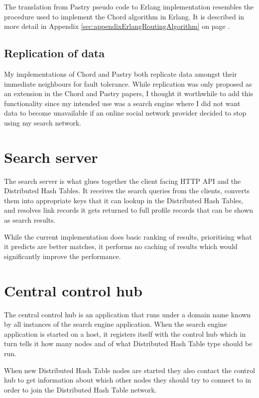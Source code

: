 

The translation from Pastry pseudo code to Erlang implementation resembles the procedure used to implement the Chord algorithm in Erlang. It is described in more detail in Appendix \ref{sec:appendixErlangRoutingAlgorithm} on page \pageref{sec:appendixErlangRoutingAlgorithm}.

\subsection{Replication of data}
My implementations of Chord and Pastry both replicate data amongst their immediate neighbours for fault tolerance. While replication was only proposed as an extension in the Chord \cite{chord} and Pastry \cite{pastry} papers, I thought it worthwhile to add this functionality since my intended use was a search engine where I did not want data to become unavailable if an online social network provider decided to stop using my search network.

\section{Search server}
The search server is what glues together the client facing HTTP API and the Distributed Hash Tables. It receives the search queries from the clients, converts them into appropriate keys that it can lookup in the Distributed Hash Tables, and resolves link records it gets returned to full profile records that can be shown as search results.

While the current implementation does basic ranking of results, prioritising what it predicts are better matches, it performs no caching of results which would significantly improve the performance.

\section{Central control hub}
The central control hub is an application that runs under a domain name known by all instances of the search engine application.
When the search engine application is started on a host, it registers itself with the control hub which in turn tells it how many nodes and of what Distributed Hash Table type should be run.

When new Distributed Hash Table nodes are started they also contact the control hub to get information about which other nodes they should try to connect to in order to join the Distributed Hash Table network.

